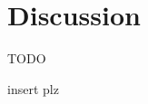 \documentclass[journal=jmcmar,manuscript=article]{achemso}
\begin{document}
\section{Discussion}
TODO


\begin{acknowledgement}


insert plz

\end{acknowledgement}

\begin{suppinfo}

\end{suppinfo}


\end{document}
